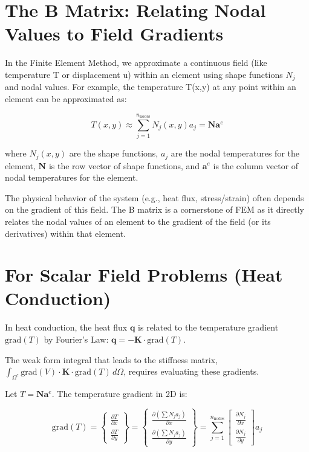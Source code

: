 \documentclass[
  11pt,
  a4paper,
]{scrbook}
\begin{document}
\section{The B Matrix: Relating Nodal Values to Field
Gradients}\label{the-b-matrix-relating-nodal-values-to-field-gradients}

In the Finite Element Method, we approximate a continuous field (like
temperature T or displacement u) within an element using shape functions
\(N_j\) and nodal values. For example, the temperature T(x,y) at any
point within an element can be approximated as:

\[T(x,y) \approx \sum_{j=1}^{n_{\text{nodes}}} N_j(x,y) a_j = \mathbf{N} \mathbf{a}^e\]

where \(N_j(x,y)\) are the shape functions, \(a_j\) are the nodal
temperatures for the element, \(\mathbf{N}\) is the row vector of shape
functions, and \(\mathbf{a}^e\) is the column vector of nodal
temperatures for the element.

The physical behavior of the system (e.g., heat flux, stress/strain)
often depends on the gradient of this field. The B matrix is a
cornerstone of FEM as it directly relates the nodal values of an element
to the gradient of the field (or its derivatives) within that element.

\section{For Scalar Field Problems (Heat
Conduction)}\label{for-scalar-field-problems-heat-conduction}

In heat conduction, the heat flux \(\mathbf{q}\) is related to the
temperature gradient \(\text{grad}(T)\) by Fourier's Law:
\(\mathbf{q} = -\mathbf{K} \cdot \text{grad}(T)\).

The weak form integral that leads to the stiffness matrix,
\(\int_{\Omega^e} \text{grad}(V) \cdot \mathbf{K} \cdot \text{grad}(T) \, d\Omega\),
requires evaluating these gradients.

Let \(T = \mathbf{N} \mathbf{a}^e\). The temperature gradient in 2D is:

\[\text{grad}(T) = \begin{Bmatrix} \frac{\partial T}{\partial x} \\ \frac{\partial T}{\partial y} \end{Bmatrix} = \begin{Bmatrix} \frac{\partial(\sum N_j a_j)}{\partial x} \\ \frac{\partial(\sum N_j a_j)}{\partial y} \end{Bmatrix} = \sum_{j=1}^{n_{\text{nodes}}} \begin{bmatrix} \frac{\partial N_j}{\partial x} \\ \frac{\partial N_j}{\partial y} \end{bmatrix} a_j\]
\end{document}
